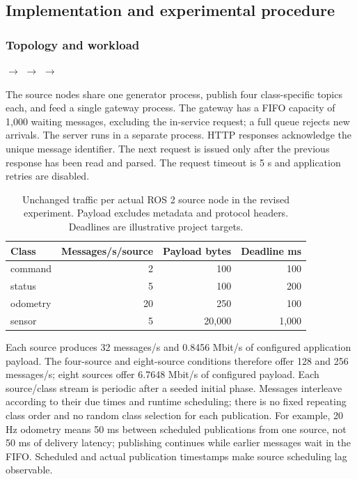 \subsection{Implementation and experimental procedure}

\subsubsection{Topology and workload}

\begin{center} $\rightarrow$  $\rightarrow$  $\rightarrow$ \end{center}

The source nodes share one generator process, publish four class-specific topics each, and feed a single gateway process. The gateway has a FIFO capacity of 1,000 waiting messages, excluding the in-service request; a full queue rejects new arrivals. The server runs in a separate process. HTTP responses acknowledge the unique message identifier. The next request is issued only after the previous response has been read and parsed. The request timeout is 5 s and application retries are disabled.

\begin{table}[H]
\centering\small
\setlength{\tabcolsep}{4pt}
\begin{tabular}{lrrr}
\hline
Class & Messages/s/source & Payload bytes & Deadline ms \\
\hline
command & 2 & 100 & 100 \\
status & 5 & 100 & 200 \\
odometry & 20 & 250 & 100 \\
sensor & 5 & 20,000 & 1,000 \\
\hline
\end{tabular}
\caption{Unchanged traffic per actual ROS 2 source node in the revised experiment. Payload excludes metadata and protocol headers. Deadlines are illustrative project targets.}
\label{tab:e1r-traffic}
\end{table}


Each source produces 32 messages/s and 0.8456 Mbit/s of configured application payload. The four-source and eight-source conditions therefore offer 128 and 256 messages/s; eight sources offer 6.7648 Mbit/s of configured payload. Each source/class stream is periodic after a seeded initial phase. Messages interleave according to their due times and runtime scheduling; there is no fixed repeating class order and no random class selection for each publication. For example, 20 Hz odometry means 50 ms between scheduled publications from one source, not 50 ms of delivery latency; publishing continues while earlier messages wait in the FIFO. Scheduled and actual publication timestamps make source scheduling lag observable.

